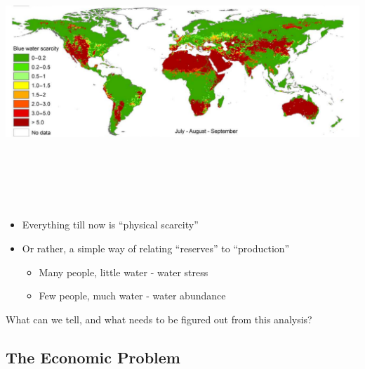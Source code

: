 \documentclass[]{article}
\providecommand{\tightlist}{%
  \setlength{\itemsep}{0pt}\setlength{\parskip}{0pt}}
\begin{document}
\hypertarget{section-13}{%
\subsection{}\label{section-13}}

\includegraphics[width=\textwidth,height=3.64583in]{figures/m10_blue_water_scarcity.png}

\hypertarget{section-14}{%
\subsection{}\label{section-14}}

\begin{itemize}
\tightlist
\item
  Everything till now is ``physical scarcity''
\item
  Or rather, a simple way of relating ``reserves'' to ``production''

  \begin{itemize}
  \tightlist
  \item
    Many people, little water - water stress
  \item
    Few people, much water - water abundance
  \end{itemize}
\end{itemize}

What can we tell, and what needs to be figured out from this analysis?

\hypertarget{the-economic-problem}{%
\subsection{The Economic Problem}\label{the-economic-problem}}
\end{document}
